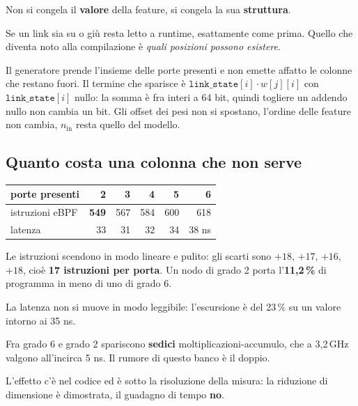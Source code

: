 \documentclass[11pt,a4paper,oneside]{report}
\begin{document}
\begin{lezione}
Non si congela il \textbf{valore} della feature, si congela la sua
\textbf{struttura}.

Se un link sia su o giù resta letto a runtime, esattamente come prima. Quello
che diventa noto alla compilazione è \emph{quali posizioni possono esistere}.
\end{lezione}

Il generatore prende l'insieme delle porte presenti e non emette affatto le
colonne che restano fuori. Il termine che sparisce è
$\texttt{link\_state}[i] \cdot w[j][i]$ con $\texttt{link\_state}[i]$ nullo: la
somma è fra interi a 64 bit, quindi togliere un addendo nullo non cambia un
bit. Gli offset dei pesi non si spostano, l'ordine delle feature non cambia,
$n_{\text{in}}$ resta quello del modello.

\subsection*{Quanto costa una colonna che non serve}

\begin{center}
\small
\begin{tabular}{@{}lrrrrr@{}}
\toprule
\textbf{porte presenti} & 2 & 3 & 4 & 5 & 6 \\
\midrule
istruzioni eBPF & \textbf{549} & 567 & 584 & 600 & 618 \\
latenza         & 33 & 31 & 32 & 34 & 38 ns \\
\bottomrule
\end{tabular}
\end{center}

Le istruzioni scendono in modo lineare e pulito: gli scarti sono $+18$, $+17$,
$+16$, $+18$, cioè \textbf{17 istruzioni per porta}. Un nodo di grado 2 porta
l'\textbf{11,2\,\%} di programma in meno di uno di grado 6.

La latenza non si muove in modo leggibile: l'escursione è del 23\,\% su un valore
intorno ai 35 ns.

\begin{lezione}
Fra grado 6 e grado 2 spariscono \textbf{sedici} moltiplicazioni-accumulo, che
a 3,2\,GHz valgono all'incirca 5 ns. Il rumore di questo banco è il doppio.

L'effetto c'è nel codice ed è sotto la risoluzione della misura: la riduzione
di dimensione è dimostrata, il guadagno di tempo \textbf{no}.
\end{lezione}
\end{document}
